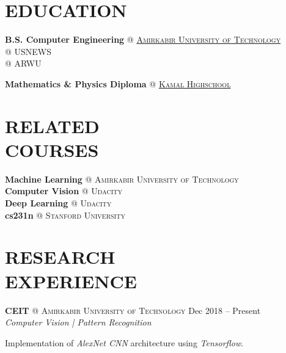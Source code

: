 \documentclass[margin, 10pt]{res} %
\begin{document}
    \begin{resume}
    
     
    \section{EDUCATION}  
    \textbf{B.S. Computer Engineering} \textsc{@}
	   \href{http://aut.ac.ir/aut/}{\textsc{Amirkabir University of Technology}}\\
	   { @ USNEWS}\hfill {}\\
	   { @ ARWU}
 	\vspace{0.1cm}
 	
    \textbf{Mathematics \& Physics Diploma} \textsc{@}
    \href{http://www.kamal.sch.ir/}{\textsc{Kamal Highschool}}\hfill {}
  
  	\vspace{0.5cm}
  	
  	\section{RELATED \\ COURSES}
	\textbf{Machine Learning} \textsc{@} \textsc{Amirkabir University of Technology}\\
	\textbf{Computer Vision} \textsc{@} \textsc{Udacity}\\
	\textbf{Deep Learning} \textsc{@} \textsc{Udacity}\\
	\textbf{cs231n} \textsc{@} \textsc{Stanford University}\\
    
    \section{RESEARCH \\ EXPERIENCE} 

	\textbf{CEIT} \textsc{@} \textsc{Amirkabir University of Technology}
	\hfill {Dec 2018 -- Present}\\
	\textit{Computer Vision | Pattern Recognition}
	\vspace{0.15cm}
	\begin{innerlist}
		\item Implementation of \textit{AlexNet CNN} architecture using \textit{Tensorflow}.
		

\end{innerlist}
\end{resume}
\end{document}
